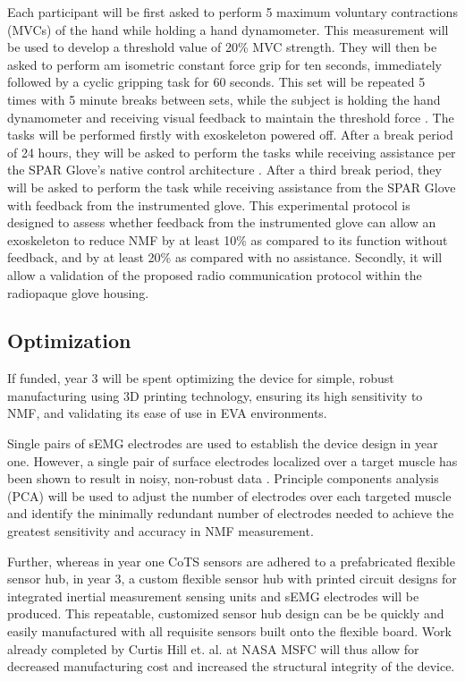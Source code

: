 \documentclass{article}
\begin{document}


Each participant will be first asked to perform 5 maximum voluntary contractions (MVCs) of the hand while holding a hand dynamometer. This measurement will be used to develop a threshold value of 20\% MVC strength. They will then be asked to perform am isometric constant force grip for ten seconds, immediately followed by a cyclic gripping task for 60 seconds. This set will be repeated 5 times with 5 minute breaks between sets, while the subject is holding the hand dynamometer and receiving visual feedback to maintain the threshold force \cite{Madden2017TheIO}. The tasks will be performed firstly with exoskeleton powered off. After a break period of 24 hours, they will be asked to perform the tasks while receiving assistance per the SPAR Glove's native control architecture \cite{Rose2019HybridRH}. After a third break period, they will be asked to perform the task while receiving assistance from the SPAR Glove with feedback from the instrumented glove. This experimental protocol is designed to assess whether feedback from the instrumented glove can allow an exoskeleton to reduce NMF by at least 10\% as compared to its function without feedback, and by at least 20\% as compared with no assistance. Secondly, it will allow a validation of the proposed radio communication protocol within the radiopaque glove housing.

\subsection{Optimization} If funded, year 3 will be spent optimizing the device for simple, robust manufacturing using 3D printing technology, ensuring its high sensitivity to NMF, and validating its ease of use in EVA environments.

Single pairs of sEMG electrodes are used to establish the device design in year one. However, a single pair of surface electrodes localized over a target muscle has been shown to result in noisy, non-robust data \cite{Min2018ElectromyogramRU}. Principle components analysis (PCA) will be used to adjust the number of electrodes over each targeted muscle and identify the minimally redundant number of electrodes needed to achieve the greatest sensitivity and accuracy in NMF measurement.

Further, whereas in year one CoTS sensors are adhered to a prefabricated flexible sensor hub, in year 3, a custom flexible sensor hub with printed circuit designs for integrated inertial measurement sensing units and sEMG electrodes will be produced. This repeatable, customized sensor hub design can be be quickly and easily manufactured \cite{CurtisHillFlexible2020} with all requisite sensors built onto the flexible board. Work already completed by Curtis Hill et. al. at NASA MSFC \cite{CurtisHillFlexible2020} will thus allow for decreased manufacturing cost and increased the structural integrity of the device. 
\end{document}
